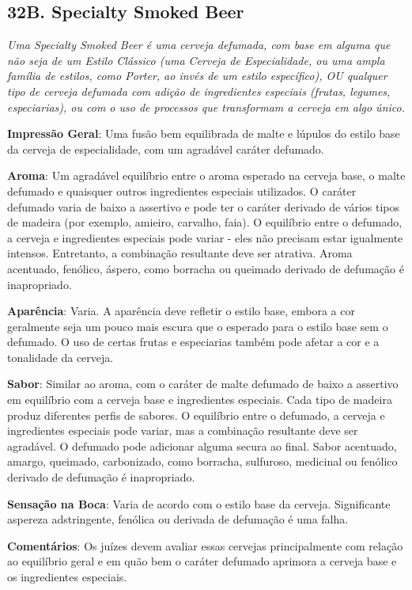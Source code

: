 \subsection*{32B. Specialty Smoked Beer}
\textit{Uma Specialty Smoked Beer é uma cerveja defumada, com base em alguma que não seja de um Estilo Clássico (uma Cerveja de Especialidade, ou uma ampla família de estilos, como Porter, ao invés de um estilo específico), OU qualquer tipo de cerveja defumada com adição de ingredientes especiais (frutas, legumes, especiarias), ou com o uso de processos que transformam a cerveja em algo único.}

\textbf{Impressão Geral}: Uma fusão bem equilibrada de malte e lúpulos do estilo base da cerveja de especialidade, com um agradável caráter defumado.

\textbf{Aroma}: Um agradável equilíbrio entre o aroma esperado na cerveja base, o malte defumado e quaisquer outros ingredientes especiais utilizados. O caráter defumado varia de baixo a assertivo e pode ter o caráter derivado de vários tipos de madeira (por exemplo, amieiro, carvalho, faia). O equilíbrio entre o defumado, a cerveja e ingredientes especiais pode variar - eles não precisam estar igualmente intensos. Entretanto, a combinação resultante deve ser atrativa. Aroma acentuado, fenólico, áspero, como borracha ou queimado derivado de defumação é inapropriado.

\textbf{Aparência}: Varia. A aparência deve refletir o estilo base, embora a cor geralmente seja um pouco mais escura que o esperado para o estilo base sem o defumado. O uso de certas frutas e especiarias também pode afetar a cor e a tonalidade da cerveja.

\textbf{Sabor}: Similar ao aroma, com o caráter de malte defumado de baixo a assertivo em equilíbrio com a cerveja base e ingredientes especiais. Cada tipo de madeira produz diferentes perfis de sabores. O equilíbrio entre o defumado, a cerveja e ingredientes especiais pode variar, mas a combinação resultante deve ser agradável. O defumado pode adicionar alguma secura ao final. Sabor acentuado, amargo, queimado, carbonizado, como borracha, sulfuroso, medicinal ou fenólico derivado de defumação é inapropriado.

\textbf{Sensação na Boca}: Varia de acordo com o estilo base da cerveja. Significante aspereza adstringente, fenólica ou derivada de defumação é uma falha.

\textbf{Comentários}: Os juízes devem avaliar essas cervejas principalmente com relação ao equilíbrio geral e em quão bem o caráter defumado aprimora a cerveja base e os ingredientes especiais.

